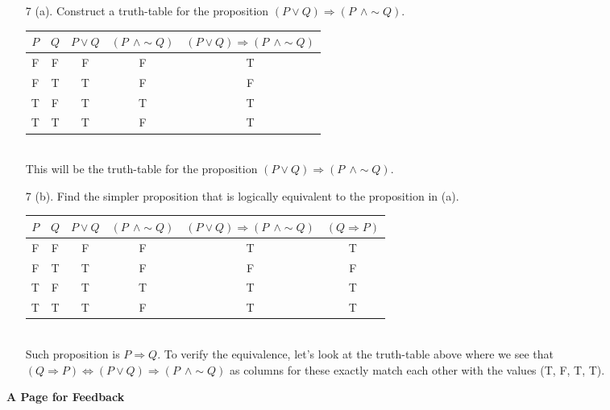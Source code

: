 \documentclass[12pt, a4paper]{article}                  %
\begin{document}
\begin{enumerate}
\item[7 (a).]
Construct a truth-table for the proposition $(P \vee Q) \Rightarrow (P \ \ \wedge \sim Q)$.
\begin{table}[h!]
	\centering
	\begin{adjustbox}{max width=\textwidth}
	\resizebox{0.8\linewidth}{!}
	{
		\begin{tabular}{*{5}{|c}|}
		\hline
		$P$ & $Q$ & $P \vee Q$ & $(P \ \ \wedge \sim Q)$ & $(P \vee Q) \Rightarrow (P \ \ \wedge \sim Q)$\\ \hline
		F & F & F & F & T\\ \hline
		F & T & T & F & F\\ \hline
		T & F & T & T & T\\ \hline
        T & T & T & F & T\\
        \hline
	\end{tabular}
    }
	\end{adjustbox}
\end{table}
\\This will be the truth-table for the proposition $(P \vee Q) \Rightarrow (P \ \ \wedge \sim Q)$.

\item[7 (b).]
Find the simpler proposition that is logically equivalent to the proposition in (a).
\begin{table}[h!]
	\centering
	\begin{adjustbox}{max width=\textwidth}
	\resizebox{0.8\linewidth}{!}
	{
		\begin{tabular}{*{6}{|c}|}
		\hline
		$P$ & $Q$ & $P \vee Q$ & $(P \ \ \wedge \sim Q)$ & $(P \vee Q) \Rightarrow (P \ \ \wedge \sim Q)$ & $(Q \Rightarrow P)$\\ \hline
		F & F & F & F & T & T\\ \hline
		F & T & T & F & F & F\\ \hline
		T & F & T & T & T & T\\ \hline
        T & T & T & F & T & T\\
        \hline
	\end{tabular}
    }
	\end{adjustbox}
\end{table}
\\ Such proposition is $P \Rightarrow Q$. To verify the equivalence, let's look at the truth-table above where we see that
$(Q \Rightarrow P) \iff (P \vee Q) \Rightarrow (P \ \ \wedge \sim Q)$ as columns for these exactly match each other with the
values (T, F, T, T).
\end{enumerate}

\newpage
\begin{center}
\LARGE{\textbf{A Page for Feedback}}
\end{center}
\end{document}

